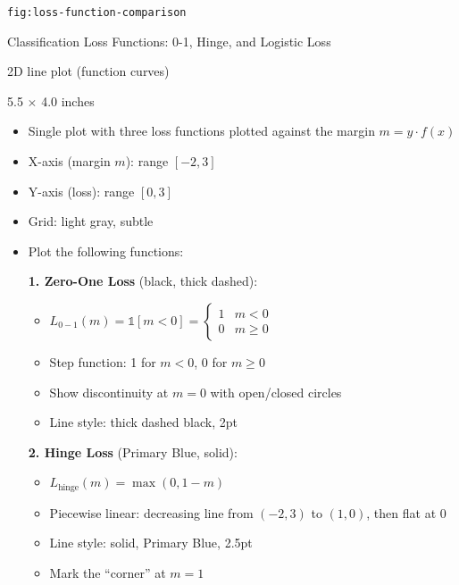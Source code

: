 \documentclass[12pt]{article}
\begin{document}
\begin{description}[style=nextline, leftmargin=0pt]
    \item[Figure ID] \texttt{fig:loss-function-comparison}
    \item[Title] Classification Loss Functions: 0-1, Hinge, and Logistic Loss
    \item[Type] 2D line plot (function curves)
    \item[Size] 5.5 $\times$ 4.0 inches

    \item[Visual Description]
    \begin{itemize}
        \item Single plot with three loss functions plotted against the margin $m = y \cdot f(x)$
        \item X-axis (margin $m$): range $[-2, 3]$
        \item Y-axis (loss): range $[0, 3]$
        \item Grid: light gray, subtle
        \item Plot the following functions:

        \textbf{1. Zero-One Loss} (black, thick dashed):
        \begin{itemize}
            \item $L_{0-1}(m) = \mathbb{1}[m < 0] = \begin{cases} 1 & m < 0 \\ 0 & m \geq 0 \end{cases}$
            \item Step function: 1 for $m < 0$, 0 for $m \geq 0$
            \item Show discontinuity at $m = 0$ with open/closed circles
            \item Line style: thick dashed black, 2pt
        \end{itemize}

        \textbf{2. Hinge Loss} (Primary Blue, solid):
        \begin{itemize}
            \item $L_{\text{hinge}}(m) = \max(0, 1 - m)$
            \item Piecewise linear: decreasing line from $(−2, 3)$ to $(1, 0)$, then flat at 0
            \item Line style: solid, Primary Blue, 2.5pt
            \item Mark the ``corner'' at $m = 1$
        \end{itemize}


\end{itemize}
\end{description}
\end{document}
